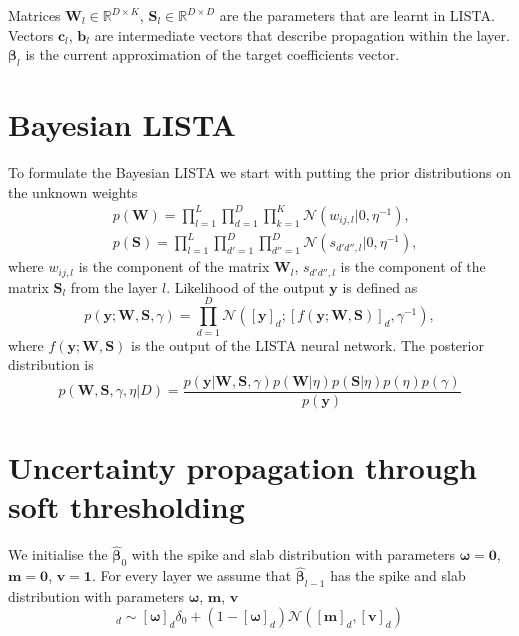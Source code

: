 \documentclass[letterpaper]{article}
\begin{document}
Matrices $\mathbf{W}_l \in \mathbb{R}^{D \times K}$, $\mathbf{S}_l\in\mathbb{R}^{D \times D}$ are the parameters that are learnt in LISTA. Vectors $\mathbf{c}_l$, $\mathbf{b}_l$ are intermediate vectors that describe propagation within the layer. $\boldsymbol\beta_l$ is the current approximation of the target coefficients vector.

\section{Bayesian LISTA}
To formulate the Bayesian LISTA we start with putting the prior distributions on the unknown weights
\begin{align}
&p(\mathbf{W}) = \prod_{l=1}^L\prod_{d=1}^D\prod_{k=1}^K \mathcal{N}(w_{ij, l} | 0, \eta^{-1}), \\
&p(\mathbf{S}) = \prod_{l=1}^L\prod_{d'=1}^D\prod_{d''=1}^D \mathcal{N}(s_{d'd'', l} | 0, \eta^{-1}),
\end{align}
where $w_{ij, l}$ is the component of the matrix $\mathbf{W}_l$, $s_{d'd'', l}$ is the component of the matrix $\mathbf{S}_l$ from the layer $l$.
Likelihood of the output $\mathbf{y}$ is defined as 
\begin{equation}
\label{eq:likelihood}
p(\mathbf{y}; \mathbf{W}, \mathbf{S}, \gamma) = \prod_{d=1}^D\mathcal{N}([\mathbf{y}]_d; [f(\mathbf{y}; \mathbf{W}, \mathbf{S})]_d, \gamma^{-1}),
\end{equation}
where $f(\mathbf{y}; \mathbf{W}, \mathbf{S})$ is the output of the LISTA neural network.
The posterior distribution is 
\begin{equation}
\label{eq:posterior}
p(\mathbf{W}, \mathbf{S}, \gamma, \eta | D) = \frac{p(\mathbf{y} | \mathbf{W},  \mathbf{S}, \gamma) p(\mathbf{W} | \eta )p(\mathbf{S} | \eta) p(\eta) p(\gamma)}{p(\mathbf{y})}
\end{equation}

\section{Uncertainty propagation through soft thresholding}
We initialise the $\widehat{\boldsymbol\beta}_{0}$ with the spike and slab distribution with parameters $\boldsymbol\omega = \mathbf{0}$, $\mathbf{m} = \mathbf{0}$, $\mathbf{v} = \mathbf{1}$. For every layer we assume that $\widehat{\boldsymbol\beta}_{l-1}$ has the spike and slab distribution with parameters $\boldsymbol\omega$, $\mathbf{m}$, $\mathbf{v}$
\begin{equation}
[\boldsymbol\beta_{l-1}]_d \sim [\boldsymbol\omega]_d \delta_0 + (1 - [\boldsymbol\omega]_d)\mathcal{N}([\mathbf{m}]_d, [\mathbf{v}]_d)
\end{equation}
\end{document}
